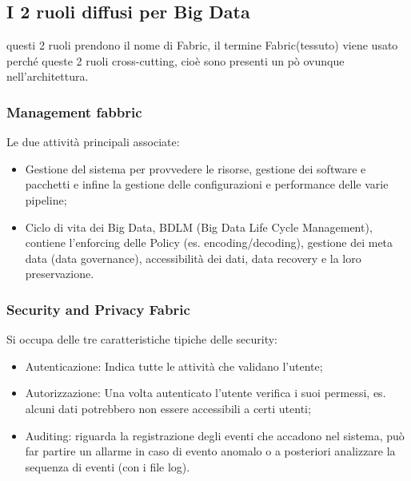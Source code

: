 \documentclass[11pt, twocolumn]{article}
\newenvironment{myitemize}
{ \begin{itemize}[topsep=0ex]
		\setlength{\itemsep}{0pt}
		\setlength{\parskip}{0pt}
		\setlength{\parsep}{0pt}     }
	{ \end{itemize}                  }
\begin{document}
\subsection{I 2 ruoli diffusi per Big Data}
questi 2 ruoli prendono il nome di Fabric, il termine Fabric(tessuto) viene usato perché queste 2 ruoli cross-cutting, cioè sono presenti un pò ovunque nell'architettura.

\subsubsection{Management fabbric}
Le due attività principali associate:
\begin{myitemize}
	\item Gestione del sistema per provvedere le risorse, gestione dei software e pacchetti e infine la gestione delle configurazioni e performance delle varie pipeline;
	\item Ciclo di vita dei Big Data, BDLM (Big Data Life Cycle Management), contiene l'enforcing delle Policy (es. encoding/decoding), gestione dei meta data (data governance), accessibilità dei dati, data recovery e la loro preservazione.
\end{myitemize}


\subsubsection{Security and Privacy Fabric}
Si occupa delle tre caratteristiche tipiche delle security: 
\begin{myitemize}
	\item Autenticazione: Indica tutte le attività che validano l'utente;
	\item Autorizzazione: Una volta autenticato l'utente verifica i suoi permessi, es. alcuni dati potrebbero non essere accessibili a certi utenti;
	\item Auditing: riguarda la registrazione degli eventi che accadono nel sistema, può far partire un allarme in caso di evento anomalo o a posteriori analizzare la sequenza di eventi (con i file log).
\end{myitemize}
\end{document}
